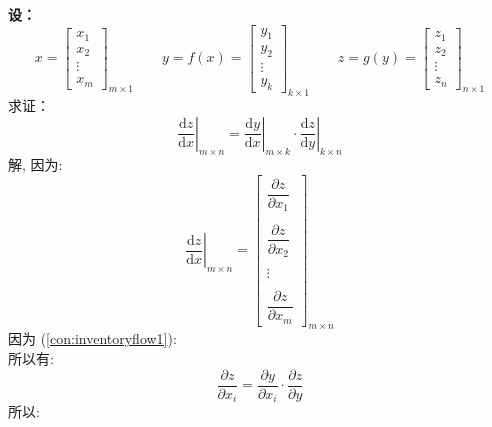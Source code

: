 \documentclass[withoutpreface,bwprint]{cumcmthesis} %
\begin{document}
		\par \textbf{设：}
	\begin{equation*}
		x=\left[
			\begin{array}{c}
				x_1\\
				x_2\\
				\vdots\\
				x_m
			\end{array}
		\right]_{m{\times}1}
		\quad \quad
		y=f(x)=\left[
		\begin{array}{c}
			y_1\\
			y_2\\
			\vdots\\
			y_k
		\end{array}\right]_{k{\times}1}
		\quad \quad
		z=g(y)=\left[\begin{array}{c}
			z_1\\
			z_2\\
			\vdots\\
			z_n
		\end{array}
		\right]_{n{\times}1}
	\end{equation*}
	求证：
	\begin{equation}	
		\left.\dfrac{\mathrm{d} z}{\mathrm{d} x}\right|_{m{\times}n}=\left.\dfrac{\mathrm{d} y}{\mathrm{d} x}\right|_{m{\times}k}\cdot  \left.\dfrac{\mathrm{d} z}{\mathrm{d} y}\right|_{k{\times}n}
	\end{equation}
	解,
	因为:	
	\begin{equation}
		\left.\dfrac{\mathrm{d} z}{\mathrm{d} x}\right|_{m{\times}n}
		=
		\left[
			\begin{array}{c}
				\dfrac{\partial z}{\partial x_1} \\\\
				\dfrac{\partial z}{\partial x_2} \\\\
				\vdots \\\\
			 	\dfrac{\partial z}{\partial x_m}
			\end{array}
		\right]_{m{\times}n}
	\end{equation}
	因为 (\ref{con:inventoryflow1}):\\
	所以有:
	\begin{equation}
		\dfrac{\partial z}{\partial x_i}=	\dfrac{\partial y}{\partial x_i}\cdot \dfrac{\partial z}{\partial y}
	\end{equation}
	所以:
\end{document}
